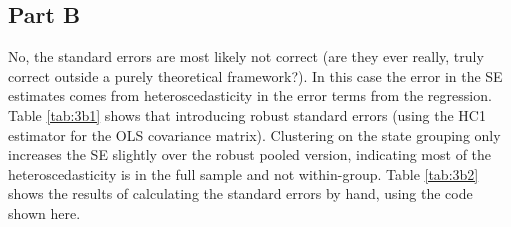 \documentclass[letterpaper, 12pt]{article}
\begin{document}
\subsection{Part B}
No, the standard errors are most likely not correct (are they ever really, truly correct outside a purely theoretical framework?).  In this case the error in the SE estimates comes from heteroscedasticity in the error terms from the regression.  Table \ref{tab:3b1} shows that introducing robust standard errors (using the HC1 estimator for the OLS covariance matrix).  Clustering on the state grouping only increases the SE slightly over the robust pooled version, indicating most of the heteroscedasticity is in the full sample and not within-group.  
Table \ref{tab:3b2} shows the results of calculating the standard errors by hand, using the code shown here.





\end{document}

